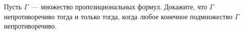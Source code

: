 Пусть $\Gamma$~--- множество пропозициональных формул. Докажите, что $\Gamma$ непротиворечиво тогда и
только тогда, когда любое конечное подмножество $\Gamma$ непротиворечиво.
